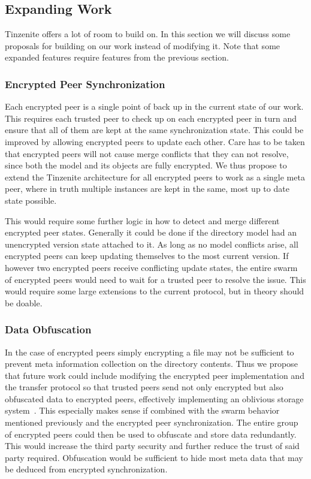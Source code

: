 \subsection{Expanding Work}
\label{sub:Expanding Work}

Tinzenite offers a lot of room to build on.
In this section we will discuss some proposals for building on our work instead of modifying it.
Note that some expanded features require features from the previous section.

\subsubsection{Encrypted Peer Synchronization}
\label{subs:Encrypted Peer Synchronization}

Each encrypted peer is a single point of back up in the current state of our work.
This requires each trusted peer to check up on each encrypted peer in turn and ensure that all of them are kept at the same synchronization state.
This could be improved by allowing encrypted peers to update each other.
Care has to be taken that encrypted peers will not cause merge conflicts that they can not resolve, since both the model and its objects are fully encrypted.
We thus propose to extend the Tinzenite architecture for all encrypted peers to work as a single meta peer, where in truth multiple instances are kept in the same, most up to date state possible.

This would require some further logic in how to detect and merge different encrypted peer states.
Generally it could be done if the directory model had an unencrypted version state attached to it.
As long as no model conflicts arise, all encrypted peers can keep updating themselves to the most current version.
If however two encrypted peers receive conflicting update states, the entire swarm of encrypted peers would need to wait for a trusted peer to resolve the issue.
This would require some large extensions to the current protocol, but in theory should be doable.

\subsubsection{Data Obfuscation}
\label{subs:Data Obfuscation}

In the case of encrypted peers simply encrypting a file may not be sufficient to prevent meta information collection on the directory contents.
Thus we propose that future work could include modifying the encrypted peer implementation and the transfer protocol so that trusted peers send not only encrypted but also obfuscated data to encrypted peers, effectively implementing an oblivious storage system~\cite{goldreich1996software}.
This especially makes sense if combined with the swarm behavior mentioned previously and the encrypted peer synchronization.
The entire group of encrypted peers could then be used to obfuscate and store data redundantly.
This would increase the third party security and further reduce the trust of said party required.
Obfuscation would be sufficient to hide most meta data that may be deduced from encrypted synchronization.

